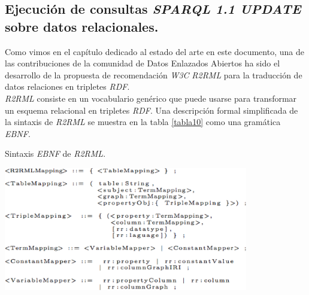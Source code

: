 \subsection{Ejecuci\'on de consultas \textit{SPARQL 1.1 UPDATE} sobre datos relacionales.}

Como vimos en el cap\'itulo dedicado al estado del arte en este documento, una de las contribuciones de la comunidad de Datos Enlazados Abiertos ha sido el desarrollo de la propuesta de recomendaci\'on \textit{W3C} \textit{R2RML} \cite{r2rml} para la traducci\'on de datos relaciones en tripletes \textit{RDF}.\\
\textit{R2RML} consiste en un vocabulario gen\'erico que puede usarse para transformar un esquema relacional en tripletes \textit{RDF}. Una descripci\'on formal simplificada de la sintaxis de \textit{R2RML} se muestra en la tabla \ref{tabla10} como una gram\'atica \textit{EBNF}.\\

\begin{table}
\vspace{2.4in}
\caption{Sintaxis \textit{EBNF} de \textit{R2RML}.}
\includegraphics[width=0.8\textwidth]{tabla10}
\label{tabla10}
\end{table}


